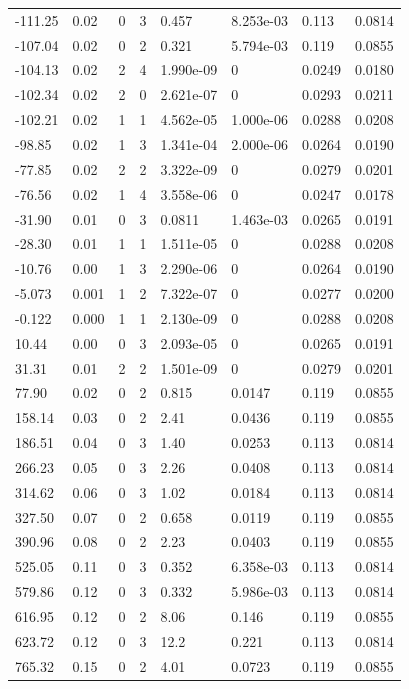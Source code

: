 \documentclass[preview]{standalone}
\begin{document}
{{\begin{tabular}{L{1.2cm}C{1.2cm} C{0.3cm}C{0.5cm} C{1.4cm}C{1.4cm} C{1.4cm}C{1.4cm}}
  -111.25  &  0.02  & 0     &  3 &  0.457  & 8.253e-03  & 0.113 &  0.0814   \\ 
  -107.04  &  0.02  & 0     &  2 &  0.321  & 5.794e-03  & 0.119 &  0.0855   \\ 
  -104.13  &  0.02  & 2     &  4 &  1.990e-09  & 0  & 0.0249 &  0.0180   \\ 
  -102.34  &  0.02  & 2     &  0 &  2.621e-07  & 0  & 0.0293 &  0.0211   \\ 
  -102.21  &  0.02  & 1     &  1 &  4.562e-05  & 1.000e-06  & 0.0288 &  0.0208   \\ 
  -98.85  &  0.02  & 1     &  3 &  1.341e-04  & 2.000e-06  & 0.0264 &  0.0190   \\ 
  -77.85  &  0.02  & 2     &  2 &  3.322e-09  & 0  & 0.0279 &  0.0201   \\ 
  -76.56  &  0.02  & 1     &  4 &  3.558e-06  & 0  & 0.0247 &  0.0178   \\ 
  -31.90  &  0.01  & 0     &  3 &  0.0811  & 1.463e-03  & 0.0265 &  0.0191   \\ 
  -28.30  &  0.01  & 1     &  1 &  1.511e-05  & 0  & 0.0288 &  0.0208   \\ 
  -10.76  &  0.00  & 1     &  3 &  2.290e-06  & 0  & 0.0264 &  0.0190   \\ 
  -5.073  &  0.001  & 1     &  2 &  7.322e-07  & 0  & 0.0277 &  0.0200   \\ 
  -0.122  &  0.000  & 1     &  1 &  2.130e-09  & 0  & 0.0288 &  0.0208   \\ 
  10.44  &  0.00  & 0     &  3 &  2.093e-05  & 0  & 0.0265 &  0.0191   \\ 
  31.31  &  0.01  & 2     &  2 &  1.501e-09  & 0  & 0.0279 &  0.0201   \\ 
  77.90  &  0.02  & 0     &  2 &  0.815  & 0.0147  & 0.119 &  0.0855   \\ 
  158.14  &  0.03  & 0     &  2 &  2.41  & 0.0436  & 0.119 &  0.0855   \\ 
  186.51  &  0.04  & 0     &  3 &  1.40  & 0.0253  & 0.113 &  0.0814   \\ 
  266.23  &  0.05  & 0     &  3 &  2.26  & 0.0408  & 0.113 &  0.0814   \\ 
  314.62  &  0.06  & 0     &  3 &  1.02  & 0.0184  & 0.113 &  0.0814   \\ 
  327.50  &  0.07  & 0     &  2 &  0.658  & 0.0119  & 0.119 &  0.0855   \\ 
  390.96  &  0.08  & 0     &  2 &  2.23  & 0.0403  & 0.119 &  0.0855   \\ 
  525.05  &  0.11  & 0     &  3 &  0.352  & 6.358e-03  & 0.113 &  0.0814   \\ 
  579.86  &  0.12  & 0     &  3 &  0.332  & 5.986e-03  & 0.113 &  0.0814   \\ 
  616.95  &  0.12  & 0     &  2 &  8.06  & 0.146  & 0.119 &  0.0855   \\ 
  623.72  &  0.12  & 0     &  3 &  12.2  & 0.221  & 0.113 &  0.0814   \\ 
  765.32  &  0.15  & 0     &  2 &  4.01  & 0.0723  & 0.119 &  0.0855   \\ 
\hline 
\end{tabular} 

}}
\end{document}

